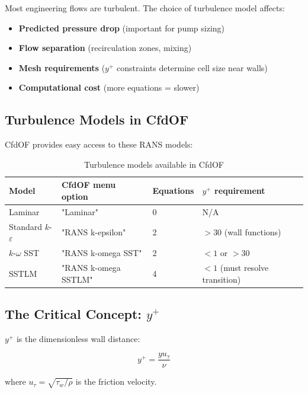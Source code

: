 \documentclass[
parskip=half,      %
DIV=12,            %
headings=normal,   %
fontsize=11pt,     %
english            %
]{scrartcl}
\begin{document}
	Most engineering flows are turbulent. The choice of turbulence model affects:
	
	\begin{itemize}
		\item \textbf{Predicted pressure drop} (important for pump sizing)
		\item \textbf{Flow separation} (recirculation zones, mixing)
		\item \textbf{Mesh requirements} ($y^+$ constraints determine cell size near walls)
		\item \textbf{Computational cost} (more equations = slower)
	\end{itemize}
	
	\subsection{Turbulence Models in CfdOF}
	
	CfdOF provides easy access to these RANS models:
	
	\begin{table}[h]
		\centering
		\begin{tabular}{|l|l|l|l|}
			\hline
			\textbf{Model} & \textbf{CfdOF menu option} & \textbf{Equations} & \textbf{$y^+$ requirement} \\
			\hline
			Laminar & "Laminar" & 0 & N/A \\
			Standard $k$-$\varepsilon$ & "RANS k-epsilon" & 2 & $> 30$ (wall functions) \\
			$k$-$\omega$ SST & "RANS k-omega SST" & 2 & $< 1$ or $> 30$ \\
			SSTLM & "RANS k-omega SSTLM" & 4 & $< 1$ (must resolve transition) \\
			\hline
		\end{tabular}
		\caption{Turbulence models available in CfdOF}
		\label{tab:models}
	\end{table}
	
	\subsection{The Critical Concept: $y^+$}
	
	$y^+$ is the dimensionless wall distance:
	
	\begin{equation}
		y^+ = \frac{y u_\tau}{\nu}
	\end{equation}
	
	where $u_\tau = \sqrt{\tau_w/\rho}$ is the friction velocity.
	
\end{document}
